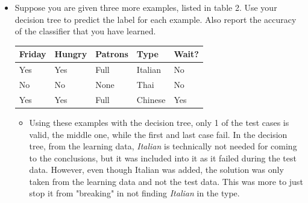 \documentclass[listings, listings-bw, listings-color, listings-sv]{article}
\begin{document}
\begin{enumerate}
\begin{itemize}
\item Suppose you are given three more examples, listed in table 2. Use your decision tree to predict the label for each example. Also report the accuracy of the classifier that you have learned.
\begin{center}
\begin{tabular}{lllll}
\hline
Friday & Hungry & Patrons & Type & Wait?\\
\hline
Yes & Yes & Full & Italian & No\\
No & No & None & Thai & No\\
Yes & Yes & Full & Chinese & Yes\\
\hline
\end{tabular}
\end{center}

\begin{itemize}
\item Using these examples with the decision tree, only 1 of the test cases is valid, the middle one, while the first and last case fail. In the decision tree, from the learning data, \emph{Italian} is technically not needed for coming to the conclusions, but it was included into it as it failed during the test data. However, even though Italian was added, the solution was only taken from the learning data and not the test data. This was more to just stop it from "breaking" in not finding \emph{Italian} in the type.
\end{itemize}
\end{itemize}


\end{enumerate}
\end{document}
